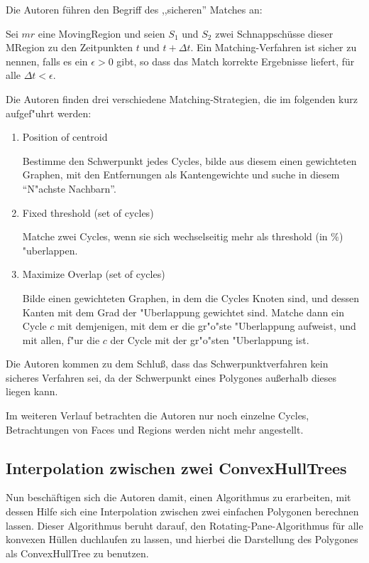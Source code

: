 Die Autoren führen den Begriff des ,,sicheren'' Matches an:

Sei $mr$ eine MovingRegion und seien $S_1$ und $S_2$ zwei Schnappschüsse dieser MRegion zu den Zeitpunkten $t$ und $t+\Delta t$. Ein Matching-Verfahren ist sicher zu nennen, falls es ein $\epsilon >0$ gibt, so dass das Match korrekte Ergebnisse liefert, für alle $\Delta t < \epsilon$.

Die Autoren finden drei verschiedene Matching-Strategien, die im folgenden kurz aufgef"uhrt werden:
\begin{enumerate}
\item Position of centroid \label{MatchSchwer}

Bestimme den Schwerpunkt jedes Cycles,  bilde aus diesem einen gewichteten Graphen, mit den Entfernungen als Kantengewichte und suche in diesem "`N"achste Nachbarn"'.
\item Fixed threshold (set of cycles)

Matche zwei Cycles, wenn sie sich wechselseitig  mehr als threshold (in \%) "uberlappen.

\item Maximize Overlap (set of cycles)

Bilde einen gewichteten Graphen, in dem die Cycles Knoten sind, und dessen Kanten mit dem Grad der "Uberlappung gewichtet sind. Matche dann ein Cycle $c$ mit demjenigen, mit dem er die gr"o"ste "Uberlappung aufweist, und mit allen, f"ur die $c$ der Cycle mit der gr"o"sten "Uberlappung ist.
\end{enumerate} 

Die Autoren kommen zu dem Schluß, dass das Schwerpunktverfahren kein sicheres Verfahren sei, da der Schwerpunkt eines Polygones außerhalb dieses liegen kann.

Im weiteren Verlauf betrachten die Autoren nur noch einzelne Cycles, Betrachtungen von Faces und Regions werden nicht mehr angestellt.

\subsection{Interpolation zwischen zwei ConvexHullTrees}

Nun beschäftigen sich die Autoren damit, einen Algorithmus zu erarbeiten, mit dessen Hilfe sich eine Interpolation zwischen zwei einfachen Polygonen berechnen lassen. Dieser Algorithmus beruht darauf, den Rotating-Pane-Algorithmus für alle konvexen Hüllen duchlaufen zu lassen, und hierbei die Darstellung des Polygones als ConvexHullTree zu benutzen.

